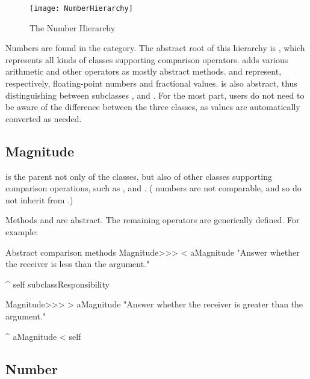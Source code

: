 \documentclass[a4paper,10pt,twoside]{book}
\begin{document}
\begin{figure}[ht]
\centerline {\texttt{[image: NumberHierarchy]}}
\caption{The Number Hierarchy \label{fig:numbers}}
\end{figure}

Numbers are found in the  category.
The abstract root of this hierarchy is , which represents all kinds of classes supporting comparison operators.
 adds various arithmetic and other operators as mostly abstract methods.  and  represent, respectively, floating-point numbers and fractional values.
 is also abstract, thus distinguishing between subclasses ,  and .
For the most part, users do not need to be aware of the difference between the three  classes, as values are automatically converted as needed.

\subsection{Magnitude}

 is the parent not only of the  classes, but also of other classes supporting comparison operations, such as ,  and .
( numbers are not comparable, and so do not inherit from .)

Methods  and  are abstract.
The remaining operators are generically defined.
For example:

\begin{method}{Abstract comparison methods}
Magnitude>>> < aMagnitude 
    "Answer whether the receiver is less than the argument."

    ^ self subclassResponsibility


Magnitude>>> > aMagnitude 
    "Answer whether the receiver is greater than the argument."

    ^ aMagnitude < self
\end{method}

\subsection{Number}
\end{document}
